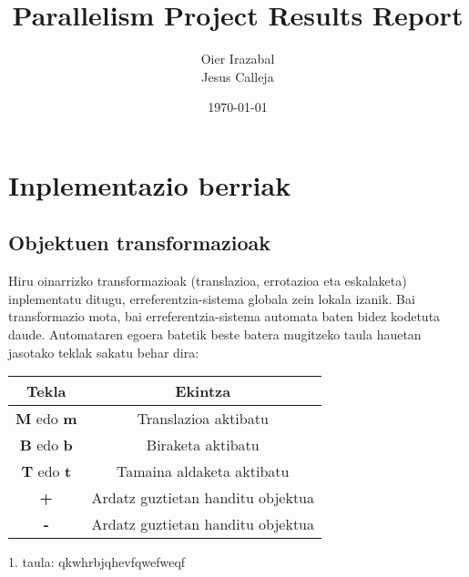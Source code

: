 \documentclass[12pt]{article}
\title{Parallelism Project Results Report}
\author{
        Oier Irazabal\\
        Jesus Calleja
}
\date{\today}
\begin{document}
\maketitle


\tableofcontents

\pagebreak



\section{Inplementazio berriak}\label{intro}

\subsection{Objektuen transformazioak}

Hiru oinarrizko transformazioak (translazioa, errotazioa eta eskalaketa) inplementatu ditugu, erreferentzia-sistema globala zein lokala izanik.
Bai transformazio mota, bai erreferentzia-sistema automata baten bidez kodetuta daude. Automataren egoera batetik beste batera mugitzeko taula hauetan jasotako teklak sakatu behar dira:\\

\begin{center}

\begin{tabular}{|c|c|}
																				\hline
	Tekla							& Ekintza								\\	\hline
	\textbf{M} edo \textbf{m}		& Translazioa aktibatu					\\	\hline
	\textbf{B} edo \textbf{b}		& Biraketa aktibatu						\\	\hline
	\textbf{T} edo \textbf{t}		& Tamaina aldaketa aktibatu				\\	\hline
	\textbf{+}						& Ardatz guztietan handitu objektua	\\	\hline
	\textbf{-}						& Ardatz guztietan handitu objektua	\\	\hline
\end{tabular}

\vspace{0.3cm}
1. taula: qkwhrbjqhevfqwefweqf
\end{center}
\end{document}
